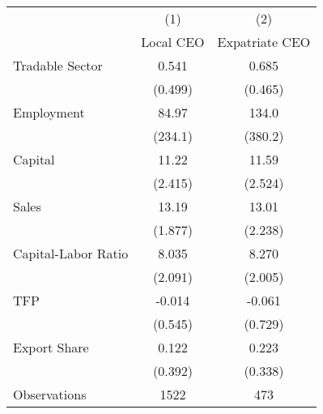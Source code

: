 {
\def\sym#1{\ifmmode^{#1}\else\(^{#1}\)\fi}
\begin{tabular}{l*{2}{c}}
\hline\hline
                    &\multicolumn{1}{c}{(1)}&\multicolumn{1}{c}{(2)}\\
                    &\multicolumn{1}{c}{Local CEO}&\multicolumn{1}{c}{Expatriate CEO}\\
\hline
Tradable Sector     &       0.541         &       0.685         \\
                    &     (0.499)         &     (0.465)         \\
[1em]
Employment          &       84.97         &       134.0         \\
                    &     (234.1)         &     (380.2)         \\
[1em]
Capital             &       11.22         &       11.59         \\
                    &     (2.415)         &     (2.524)         \\
[1em]
Sales               &       13.19         &       13.01         \\
                    &     (1.877)         &     (2.238)         \\
[1em]
Capital-Labor Ratio &       8.035         &       8.270         \\
                    &     (2.091)         &     (2.005)         \\
[1em]
TFP                 &     -0.014          &     -0.061         \\
                    &     (0.545)         &     (0.729)         \\
[1em]
Export Share        &       0.122         &       0.223         \\
                    &     (0.392)         &     (0.338)         \\
\hline
Observations        &        1522         &         473         \\
\hline\hline
\end{tabular}
}
